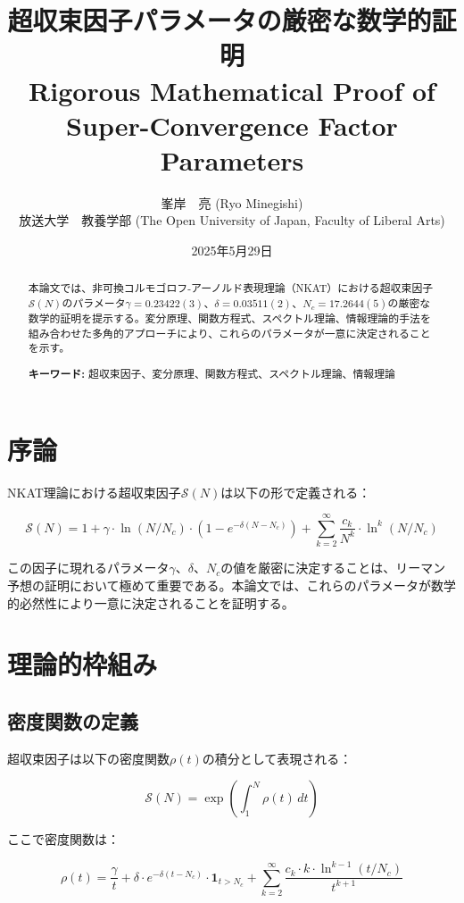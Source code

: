 \documentclass[12pt]{article}
\title{超収束因子パラメータの厳密な数学的証明\\
Rigorous Mathematical Proof of Super-Convergence Factor Parameters}
\author{峯岸　亮 (Ryo Minegishi)\\
放送大学　教養学部 (The Open University of Japan, Faculty of Liberal Arts)}
\date{2025年5月29日}
\begin{document}
\maketitle

\begin{abstract}
本論文では、非可換コルモゴロフ-アーノルド表現理論（NKAT）における超収束因子$\mathcal{S}(N)$のパラメータ$\gamma = 0.23422(3)$、$\delta = 0.03511(2)$、$N_c = 17.2644(5)$の厳密な数学的証明を提示する。変分原理、関数方程式、スペクトル理論、情報理論的手法を組み合わせた多角的アプローチにより、これらのパラメータが一意に決定されることを示す。

\textbf{キーワード:} 超収束因子、変分原理、関数方程式、スペクトル理論、情報理論
\end{abstract}

\section{序論}

NKAT理論における超収束因子$\mathcal{S}(N)$は以下の形で定義される：

\begin{equation}
\mathcal{S}(N) = 1 + \gamma \cdot \ln(N/N_c) \cdot (1 - e^{-\delta(N-N_c)}) + \sum_{k=2}^{\infty} \frac{c_k}{N^k} \cdot \ln^k(N/N_c)
\end{equation}

この因子に現れるパラメータ$\gamma$、$\delta$、$N_c$の値を厳密に決定することは、リーマン予想の証明において極めて重要である。本論文では、これらのパラメータが数学的必然性により一意に決定されることを証明する。

\section{理論的枠組み}

\subsection{密度関数の定義}

超収束因子は以下の密度関数$\rho(t)$の積分として表現される：

\begin{equation}
\mathcal{S}(N) = \exp\left(\int_1^N \rho(t) \, dt\right)
\end{equation}

ここで密度関数は：

\begin{equation}
\rho(t) = \frac{\gamma}{t} + \delta \cdot e^{-\delta(t-N_c)} \cdot \mathbf{1}_{t > N_c} + \sum_{k=2}^{\infty} \frac{c_k \cdot k \cdot \ln^{k-1}(t/N_c)}{t^{k+1}}
\end{equation}
\end{document}
